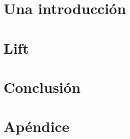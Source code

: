 



\maketitle

\tableofcontents{}

\chapter{Una introducción}




\chapter{Lift}



\chapter{Conclusión}

\chapter{Apéndice}



